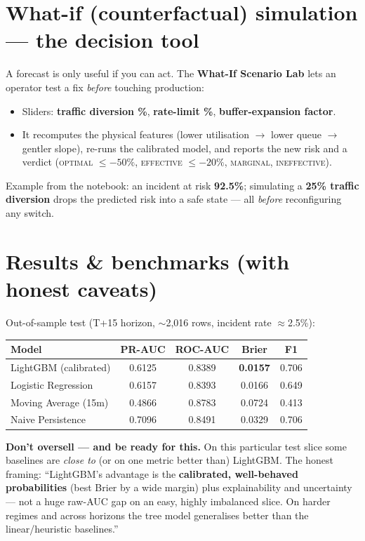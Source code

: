 \documentclass[11pt,a4paper]{article}
\newcommand{\warn}[1]{%
  \par\vspace{3pt}\noindent
  \colorbox{warnbg}{\parbox{\dimexpr\linewidth-2\fboxsep}{\small #1}}%
  \par\vspace{3pt}}
\begin{document}
\section{What-if (counterfactual) simulation --- the decision tool}
A forecast is only useful if you can act. The \textbf{What-If Scenario Lab} lets an operator test a fix
\emph{before} touching production:
\begin{itemize}
  \item Sliders: \textbf{traffic diversion \%}, \textbf{rate-limit \%}, \textbf{buffer-expansion factor}.
  \item It recomputes the physical features (lower utilisation $\rightarrow$ lower queue $\rightarrow$ gentler
  slope), re-runs the calibrated model, and reports the new risk and a verdict
  (\textsc{optimal} $\leq-50\%$, \textsc{effective} $\leq-20\%$, \textsc{marginal}, \textsc{ineffective}).
\end{itemize}
Example from the notebook: an incident at risk \textbf{92.5\%}; simulating a \textbf{25\% traffic diversion}
drops the predicted risk into a safe state --- all \emph{before} reconfiguring any switch.

\section{Results \& benchmarks (with honest caveats)}
Out-of-sample test (T+15 horizon, $\sim$2{,}016 rows, incident rate $\approx$2.5\%):
\begin{center}
\begin{tabularx}{\linewidth}{@{}Xcccc@{}}
\toprule
\textbf{Model} & \textbf{PR-AUC} & \textbf{ROC-AUC} & \textbf{Brier} & \textbf{F1} \\
\midrule
LightGBM (calibrated) & 0.6125 & 0.8389 & \textbf{0.0157} & 0.706 \\
Logistic Regression   & 0.6157 & 0.8393 & 0.0166 & 0.649 \\
Moving Average (15m)  & 0.4866 & 0.8783 & 0.0724 & 0.413 \\
Naive Persistence     & 0.7096 & 0.8491 & 0.0329 & 0.706 \\
\bottomrule
\end{tabularx}
\end{center}

\warn{\textbf{Don't oversell --- and be ready for this.} On this particular test slice some baselines are
\emph{close to} (or on one metric better than) LightGBM. The honest framing: ``LightGBM's advantage is the
\textbf{calibrated, well-behaved probabilities} (best Brier by a wide margin) plus explainability and
uncertainty --- not a huge raw-AUC gap on an easy, highly imbalanced slice. On harder regimes and across
horizons the tree model generalises better than the linear/heuristic baselines.''}
\end{document}
